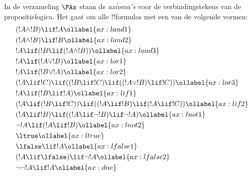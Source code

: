 \documentclass[openany]{memoir}
\begin{document}
\begingroup
\def\olfilename{OLP-0114}
\def\olfilepath{content/first-order-logic/axiomatic-deduction/}
\hypertarget{unit-OLP-0114}{}



      {}
      {}


\begin{defn}[Axioma's]
In de verzameling $\PAx$ staan de \emph{axioma's} voor de
verbindingstekens van de propositielogica. Het gaat om alle
!!{formula}s met een van de volgende vormen:
\begin{align}
  & (!A \land !B) \lif !A \ollabel{ax:land1}\\
  & (!A \land !B) \lif !B \ollabel{ax:land2}\\
  & !A \lif (!B \lif (!A \land !B)) \ollabel{ax:land3}\\
  & !A \lif (!A \lor !B) \ollabel{ax:lor1}\\
  & !A \lif (!B \lor !A) \ollabel{ax:lor2}\\
  & (!A \lif !C) \lif ((!B \lif !C) \lif ((!A \lor !B) \lif !C)) \ollabel{ax:lor3}\\
  & !A \lif (!B \lif !A) \ollabel{ax:lif1}\\
  & (!A \lif (!B \lif !C)) \lif ((!A \lif !B) \lif (!A \lif !C)) \ollabel{ax:lif2}\\
  & (!A \lif !B) \lif ((!A \lif \lnot !B) \lif \lnot !A) \ollabel{ax:lnot1}\\
  & \lnot !A \lif (!A \lif !B) \ollabel{ax:lnot2}\\
  & \ltrue \ollabel{ax:ltrue}\\
  & \lfalse \lif !A \ollabel{ax:lfalse1}\\
  & (!A \lif \lfalse) \lif \lnot !A \ollabel{ax:lfalse2}\\
  & \lnot\lnot !A \lif !A \ollabel{ax:dne}
\end{align}
\end{defn}
\end{document}
